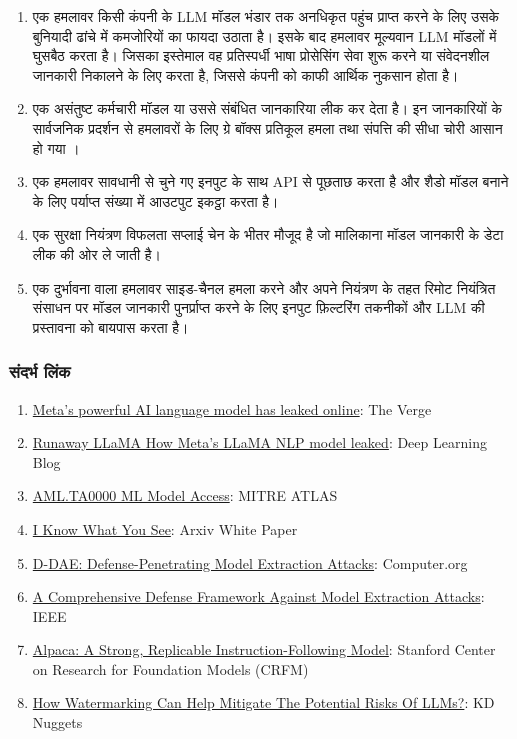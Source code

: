 \documentclass[
]{article}
\providecommand{\tightlist}{%
  \setlength{\itemsep}{0pt}\setlength{\parskip}{0pt}}
\begin{document}
\begin{enumerate}
\def\labelenumi{\arabic{enumi}.}
\tightlist
\item
  एक हमलावर किसी कंपनी के LLM मॉडल भंडार तक अनधिकृत पहुंच प्राप्त करने के लिए उसके
  बुनियादी ढांचे में कमजोरियों का फायदा उठाता है। इसके बाद हमलावर मूल्यवान LLM
  मॉडलों में घुसबैठ करता है। जिसका इस्तेमाल वह प्रतिस्पर्धी भाषा प्रोसेसिंग सेवा शुरू करने
  या संवेदनशील जानकारी निकालने के लिए करता है, जिससे कंपनी को काफी आर्थिक नुकसान
  होता है।
\item
  एक असंतुष्ट कर्मचारी मॉडल या उससे संबंधित जानकारिया लीक कर देता है। इन
  जानकारियों के सार्वजनिक प्रदर्शन से हमलावरों के लिए ग्रे बॉक्स प्रतिकूल हमला तथा
  संपत्ति की सीधा चोरी आसान हो गया ।
\item
  एक हमलावर सावधानी से चुने गए इनपुट के साथ API से पूछताछ करता है और शैडो मॉडल
  बनाने के लिए पर्याप्त संख्या में आउटपुट इकट्ठा करता है।
\item
  एक सुरक्षा नियंत्रण विफलता सप्लाई चेन के भीतर मौजूद है जो मालिकाना मॉडल जानकारी
  के डेटा लीक की ओर ले जाती है।
\item
  एक दुर्भावना वाला हमलावर साइड-चैनल हमला करने और अपने नियंत्रण के तहत रिमोट
  नियंत्रित संसाधन पर मॉडल जानकारी पुनर्प्राप्त करने के लिए इनपुट फ़िल्टरिंग तकनीकों
  और LLM की प्रस्तावना को बायपास करता है।
\end{enumerate}

\subsubsection{संदर्भ लिंक}\label{ux938ux926ux930ux92d-ux932ux915}

\begin{enumerate}
\def\labelenumi{\arabic{enumi}.}
\tightlist
\item
  \href{https://www.theverge.com/2023/3/8/23629362/meta-ai-language-model-llama-leak-online-misuse}{Meta's
  powerful AI language model has leaked online}: The Verge
\item
  \href{https://www.deeplearning.ai/the-batch/how-metas-llama-nlp-model-leaked/}{Runaway
  LLaMA \textbar{} How Meta's LLaMA NLP model leaked}: Deep Learning
  Blog
\item
  \href{https://atlas.mitre.org/tactics/AML.TA0000/}{AML.TA0000 ML Model
  Access}: MITRE ATLAS
\item
  \href{https://arxiv.org/pdf/1803.05847.pdf}{I Know What You See}:
  Arxiv White Paper
\item
  \href{https://www.computer.org/csdl/proceedings-article/sp/2023/933600a432/1He7YbsiH4c}{D-DAE:
  Defense-Penetrating Model Extraction Attacks}: Computer.org
\item
  \href{https://ieeexplore.ieee.org/document/10080996}{A Comprehensive
  Defense Framework Against Model Extraction Attacks}: IEEE
\item
  \href{https://crfm.stanford.edu/2023/03/13/alpaca.html}{Alpaca: A
  Strong, Replicable Instruction-Following Model}: Stanford Center on
  Research for Foundation Models (CRFM)
\item
  \href{https://www.kdnuggets.com/2023/03/watermarking-help-mitigate-potential-risks-llms.html}{How
  Watermarking Can Help Mitigate The Potential Risks Of LLMs?}: KD
  Nuggets
\end{enumerate}
\end{document}
